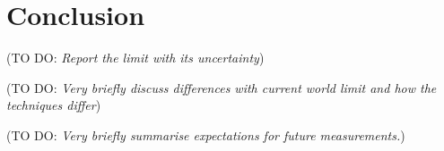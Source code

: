\documentclass[12pt]{article}
\newcommand{\todo }[1]{({\color{red}\sc TO DO: \textit{#1}})}
\begin{document}







\section{Conclusion}\label{sec:Conclusion}
\todo{Report the limit with its uncertainty}

\todo{Very briefly discuss differences with current world limit and how the techniques differ}

\todo{Very briefly summarise expectations for future measurements.}

\printglossaries


\end{document}
